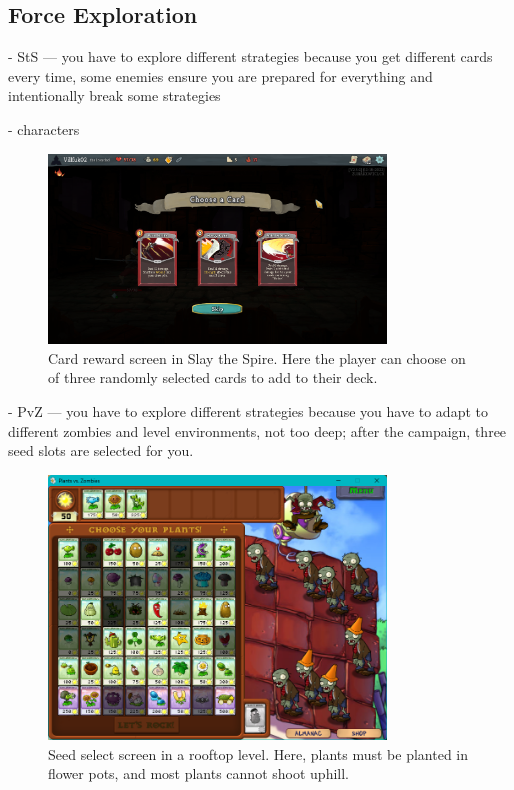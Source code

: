 \subsection{Force Exploration}

- StS --- you have to explore different strategies because you get different cards every time, some enemies ensure you are prepared for everything and intentionally break some strategies

- characters

\begin{figure}[htb]
    \centering
    \includegraphics[width=0.8\textwidth]{img/Slay-the-Spire-Reward.png}
    \caption{Card reward screen in Slay the Spire. Here the player can choose on of three randomly selected cards to add to their deck.}
    \label{fig:slay-the-spire-reward}
\end{figure}

- PvZ --- you have to explore different strategies because you have to adapt to different zombies and level environments, not too deep; after the campaign, three seed slots are selected for you.

\begin{figure}[htb]
    \centering
    \includegraphics[width=0.8\textwidth]{img/Plants-vs-Zombies-Rooftop.png}
    \caption{Seed select screen in a rooftop level. Here, plants must be planted in flower pots, and most plants cannot shoot uphill.}
    \label{fig:plants-vs-zombies-roof}
\end{figure}

